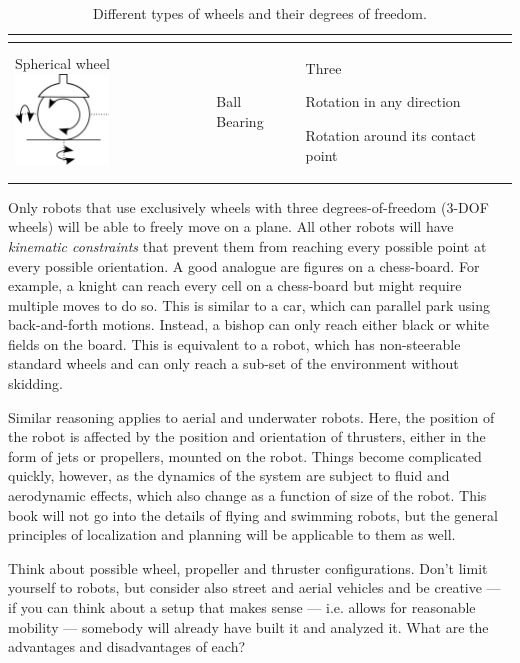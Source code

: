 \begin{table}
\begin{tabular}{p{2.8cm}p{3cm}p{4cm}}
\begin{compactitem}
\end{compactitem}\\
\hline
Spherical wheel \includegraphics[width=2.5cm]{figs/wheeltype_spherical.png}& Ball Bearing & Three
\begin{compactitem}
\item Rotation in any direction
\item Rotation around its contact point
\end{compactitem}\\
\hline
\end{tabular}
\caption{Different types of wheels and their degrees of freedom.\label{tab:wheels}}
\end{table}

Only robots that use exclusively wheels with three degrees-of-freedom (3-DOF wheels) will be able to freely move on a plane. All other robots will have \emph{kinematic constraints} that prevent them from reaching every possible point at every possible orientation. A good analogue are figures on a chess-board. For example, a knight can reach every cell on a chess-board but might require multiple moves to do so. This is similar to a car, which can parallel park using back-and-forth motions. Instead, a bishop can only reach either black or white fields on the board. This is equivalent to a robot, which has non-steerable standard wheels and can only reach a sub-set of the environment without skidding.

Similar reasoning applies to aerial and underwater robots. Here, the position of the robot is affected by the position and orientation of thrusters, either in the form of jets or propellers, mounted on the robot. Things become complicated quickly, however, as the dynamics of the system are subject to fluid and aerodynamic effects, which also change as a function of size of the robot. This book will not go into the details of flying and swimming robots, but the general principles of localization and planning will be applicable to them as well.

\begin{framed}Think about possible wheel, propeller and thruster configurations. Don't limit yourself to robots, but consider also street and aerial vehicles and be creative --- if you can think about a setup that makes sense --- i.e. allows for reasonable mobility --- somebody will already have built it and analyzed it. What are the advantages and disadvantages of each?
\end{framed}

